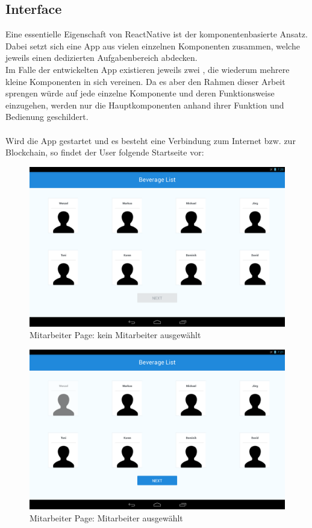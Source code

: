 \subsection{Interface}
\label{subsec:interface}
Eine essentielle Eigenschaft von ReactNative ist der komponentenbasierte Ansatz. Dabei setzt sich eine App aus vielen einzelnen Komponenten zusammen, welche jeweils einen dedizierten Aufgabenbereich abdecken. \\
Im Falle der entwickelten App existieren jeweils zwei , die wiederum mehrere kleine Komponenten in sich vereinen. 
Da es aber den Rahmen dieser Arbeit sprengen würde auf jede einzelne Komponente und deren Funktionsweise einzugehen, werden nur die Hauptkomponenten anhand ihrer Funktion und Bedienung geschildert. \\\\
Wird die App gestartet und es besteht eine Verbindung zum Internet bzw. zur Blockchain, so findet der User folgende Startseite vor: 

\begin{figure}[th!]
	\centering
	\includegraphics[width=.9\columnwidth]{./Abbildungen/Kapitel_03/emps1.png}
	\caption{Mitarbeiter Page: kein Mitarbeiter ausgewählt}
	\label{img:emps1}
\end{figure}

\begin{figure}[th!]
	\centering
	\includegraphics[width=.9\columnwidth]{./Abbildungen/Kapitel_03/emps2.png}
	\caption{Mitarbeiter Page: Mitarbeiter ausgewählt}
	\label{img:emps2}
\end{figure}

